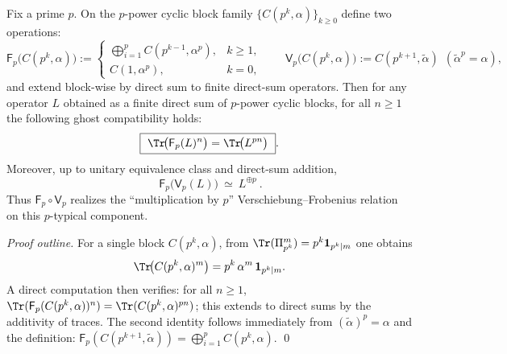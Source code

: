 \begin{proposition}\label{prop:cyclic-p-typical-frobenius-verschiebung}
Fix a prime \(p\).
On the \(p\)-power cyclic block family \(\{C(p^k,\alpha)\}_{k\ge 0}\) define two operations:
\[
\mathsf F_p\bigl(C(p^k,\alpha)\bigr):=
\begin{cases}
\bigoplus_{i=1}^{p} C(p^{k-1},\alpha^{p}),& k\ge 1,\\
C(1,\alpha^{p}),& k=0,
\end{cases}
\qquad
\mathsf V_p\bigl(C(p^k,\alpha)\bigr):=C(p^{k+1},\widetilde\alpha)\ \ (\widetilde\alpha^{p}=\alpha),
\]
and extend block-wise by direct sum to finite direct-sum operators.
Then for any operator \(L\) obtained as a finite direct sum of \(p\)-power cyclic blocks, for all \(n\ge 1\) the following ghost compatibility holds:
\[
\boxed{\ \Tr\!\bigl(\mathsf F_p(L)^n\bigr)=\Tr\!\bigl(L^{pn}\bigr)\ }.
\]
Moreover, up to unitary equivalence class and direct-sum addition,
\[
\boxed{\ \mathsf F_p\!\bigl(\mathsf V_p(L)\bigr)\ \simeq\ L^{\oplus p}\ }.
\]
Thus \(\mathsf F_p\circ \mathsf V_p\) realizes the ``multiplication by \(p\)'' Verschiebung--Frobenius relation on this \(p\)-typical component.
\end{proposition}

\begin{proof}[Proof outline]
For a single block \(C(p^k,\alpha)\), from \(\Tr(\Pi_{p^k}^m)=p^k\mathbf{1}_{p^k\mid m}\) one obtains
\[
\Tr\!\bigl(C(p^k,\alpha)^{m}\bigr)=p^k\,\alpha^{m}\,\mathbf{1}_{p^k\mid m}.
\]
A direct computation then verifies: for all \(n\ge 1\),
\(\Tr(\mathsf F_p(C(p^k,\alpha))^n)=\Tr(C(p^k,\alpha)^{pn})\);
this extends to direct sums by the additivity of traces.
The second identity follows immediately from \((\widetilde\alpha)^p=\alpha\) and the definition:
\(\mathsf F_p(C(p^{k+1},\widetilde\alpha))=\bigoplus_{i=1}^{p}C(p^k,\alpha)\).
\qed
\end{proof}

